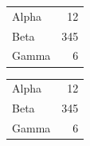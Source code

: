 \documentclass[aspectratio=169]{beamer}
\begin{document}
\begin{frame}[plain,t]
\def\arraystretch{1.5}
\begin{tabular}{lr}
Alpha & 12 \\
Beta & 345 \\
Gamma & 6 \\
\end{tabular}
\end{frame}

\begin{frame}[plain,t]
\renewcommand{\arraystretch}{1.5}
\begin{tabular}{lr}
Alpha & 12 \\
Beta & 345 \\
Gamma & 6 \\
\end{tabular}
\end{frame}
\end{document}
